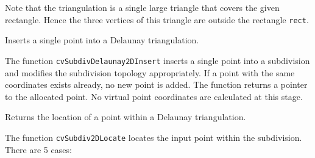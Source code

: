 Note that the triangulation is a single large triangle that covers the given rectangle.  Hence the three vertices of this triangle are outside the rectangle \texttt{rect}.

\label{SubdivDelaunay2DInsert}

Inserts a single point into a Delaunay triangulation.


\begin{description}
\end{description}

The function \texttt{cvSubdivDelaunay2DInsert} inserts a single point into a subdivision and modifies the subdivision topology appropriately. If a point with the same coordinates exists already, no new point is added. The function returns a pointer to the allocated point. No virtual point coordinates are calculated at this stage.

\label{Subdiv2DLocate}

Returns the location of a point within a Delaunay triangulation.


\begin{description}
\end{description}

The function \texttt{cvSubdiv2DLocate} locates the input point within the subdivision. There are 5 cases:

